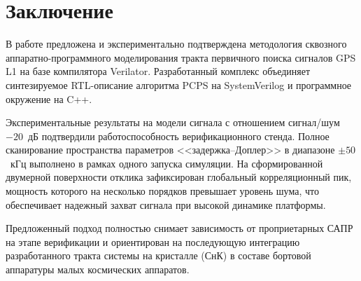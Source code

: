 \section{Заключение}
В работе предложена и экспериментально подтверждена методология сквозного аппаратно-программного моделирования тракта первичного поиска сигналов GPS L1 на базе компилятора Verilator. Разработанный комплекс объединяет синтезируемое RTL-описание алгоритма PCPS на SystemVerilog и программное окружение на C++.

Экспериментальные результаты на модели сигнала с отношением сигнал/шум \(-20\)~дБ подтвердили работоспособность верификационного стенда. Полное сканирование пространства параметров <<задержка--Доплер>> в диапазоне \(\pm50\)~кГц выполнено в рамках одного запуска симуляции. На сформированной двумерной поверхности отклика зафиксирован глобальный корреляционный пик, мощность которого на несколько порядков превышает уровень шума, что обеспечивает надежный захват сигнала при высокой динамике платформы.

Предложенный подход полностью снимает зависимость от проприетарных САПР на этапе верификации и ориентирован на последующую интеграцию разработанного тракта системы на кристалле (СнК) в составе бортовой аппаратуры малых космических аппаратов.
